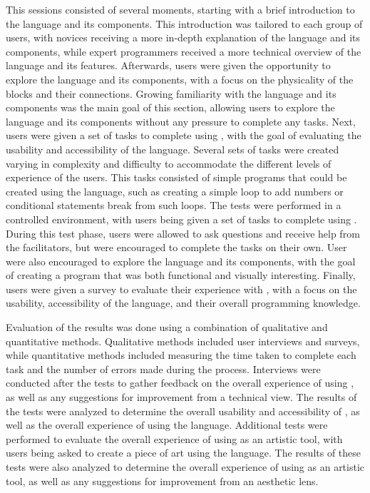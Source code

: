 This sessions consisted of several moments, starting with a brief introduction to the language and its components.
This introduction was tailored to each group of users, with novices receiving a more in-depth explanation of the language and its components, while expert programmers received a more technical overview of the language and its features.
Afterwards, users were given the opportunity to explore the language and its components, with a focus on the physicality of the blocks and their connections. Growing familiarity with the language and its components was the main goal of this section, allowing users to explore the language and its components without any pressure to complete any tasks.
Next, users were given a set of tasks to complete using \sculpt, with the goal of evaluating the usability and accessibility of the language.
Several sets of tasks were created varying in complexity and difficulty to accommodate the different levels of experience of the users.
This tasks consisted of simple programs that could be created using the language, such as creating a simple loop to add numbers or conditional statements break from such loops.
The tests were performed in a controlled environment, with users being given a set of tasks to complete using \sculpt.
During this test phase, users were allowed to ask questions and receive help from the facilitators, but were encouraged to complete the tasks on their own.
User were also encouraged to explore the language and its components, with the goal of creating a program that was both functional and visually interesting.
Finally, users were given a survey to evaluate their experience with \sculpt, with a focus on the usability, accessibility of the language, and their overall programming knowledge.

Evaluation of the results was done using a combination of qualitative and quantitative methods.
Qualitative methods included user interviews and surveys, while quantitative methods included measuring the time taken to complete each task and the number of errors made during the process.
Interviews were conducted after the tests to gather feedback on the overall experience of using \sculpt, as well as any suggestions for improvement from a technical view.
The results of the tests were analyzed to determine the overall usability and accessibility of \sculpt, as well as the overall experience of using the language.
Additional tests were performed to evaluate the overall experience of using \sculpt as an artistic tool, with users being asked to create a piece of art using the language.
The results of these tests were also analyzed to determine the overall experience of using \sculpt as an artistic tool, as well as any suggestions for improvement from an aesthetic lens.
\endinput